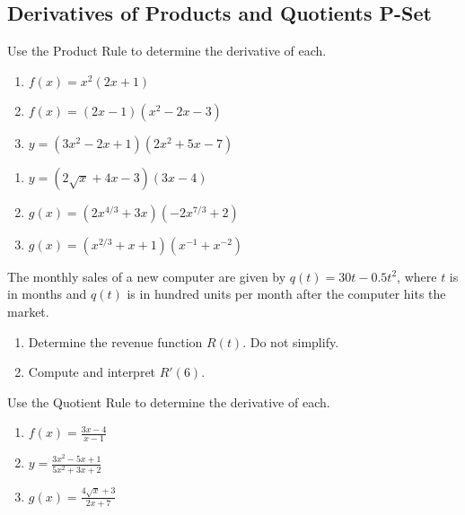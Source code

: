 \documentclass{article}
\newcounter{pset}
\begin{document}
\subsection*{Derivatives of Products and Quotients P-Set}

Use the Product Rule to determine the derivative of each.
\begin{multicols}{3}
\begin{enumerate}
    \item $f(x) = x^2(2x+1)$
    \item $f(x) = (2x-1)(x^2-2x-3)$
    \item $y = (3x^2-2x+1)(2x^2+5x-7)$
\end{enumerate} \setcounter{pset}{\value{enumi}}
\end{multicols}
\begin{multicols}{3}
\begin{enumerate}   \setcounter{enumi}{\value{pset}}
    \item $y = (2\sqrt{x} + 4x - 3)(3x-4)$
    \item $g(x) = (2x^{4/3}+3x)(-2x^{7/3}+2)$
    \item $g(x) = (x^{2/3}+x+1)(x^{-1}+x^{-2})$
\end{enumerate} \setcounter{pset}{\value{enumi}}
\end{multicols}

The monthly sales of a new computer are given by $q(t) = 30t-0.5t^2$, where $t$ is in months and $q(t)$ is in hundred units per month after the computer hits the market.
\begin{enumerate}   \setcounter{enumi}{\value{pset}}
    \item Determine the revenue function $R(t)$. Do not simplify.
    \item Compute and interpret $R'(6)$.
\end{enumerate} \setcounter{pset}{\value{enumi}}
\bigskip 

Use the Quotient Rule to determine the derivative of each.
\begin{multicols}{3}
\begin{enumerate}   \setcounter{enumi}{\value{pset}}
    \item $f(x) = \frac{3x-4}{x-1}$
    \item $y = \frac{3x^2-5x+1}{5x^2+3x+2}$
    \item $g(x) = \frac{4\sqrt{x}+3}{2x+7}$
\end{enumerate} \setcounter{pset}{\value{enumi}}
\end{multicols}
\end{document}
